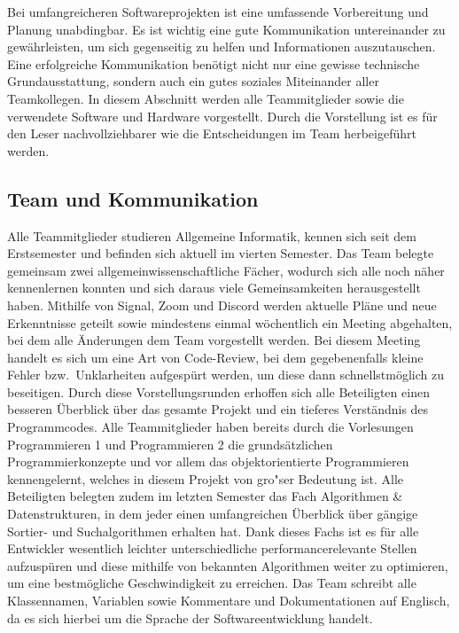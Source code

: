 Bei umfangreicheren Softwareprojekten ist eine umfassende Vorbereitung und Planung unabdingbar.
Es ist wichtig eine gute Kommunikation untereinander zu gew\"ahrleisten, um sich gegenseitig zu helfen und Informationen auszutauschen.
Eine erfolgreiche Kommunikation ben\"otigt nicht nur eine gewisse technische Grundausstattung, sondern auch ein gutes soziales Miteinander aller Teamkollegen.
In diesem Abschnitt werden alle Teammitglieder sowie die verwendete Software und Hardware vorgestellt.
Durch die Vorstellung ist es f\"ur den Leser nachvollziehbarer wie die Entscheidungen im Team herbeigef\"uhrt werden.

\subsection{Team und Kommunikation}\label{subsec:team-und-kommunikation}
Alle Teammitglieder studieren Allgemeine Informatik, kennen sich seit dem Erstsemester und befinden sich aktuell im vierten Semester.
Das Team belegte gemeinsam zwei allgemeinwissenschaftliche F\"acher, wodurch sich alle noch n\"aher kennenlernen konnten und sich daraus viele Gemeinsamkeiten herausgestellt haben.
Mithilfe von Signal, Zoom und Discord werden aktuelle Pl\"ane und neue Erkenntnisse geteilt sowie mindestens einmal w\"ochentlich ein Meeting abgehalten, bei dem alle \"Anderungen dem Team vorgestellt werden.
Bei diesem Meeting handelt es sich um eine Art von Code-Review, bei dem gegebenenfalls kleine Fehler bzw.\ Unklarheiten aufgesp\"urt werden, um diese dann schnellstm\"oglich zu beseitigen.
Durch diese Vorstellungsrunden erhoffen sich alle Beteiligten einen besseren \"Uberblick \"uber das gesamte Projekt und ein tieferes Verst\"andnis des Programmcodes.
Alle Teammitglieder haben bereits durch die Vorlesungen Programmieren 1 und Programmieren 2 die grunds\"atzlichen Programmierkonzepte und vor allem das objektorientierte Programmieren kennengelernt, welches in diesem Projekt von gro"ser Bedeutung ist.
Alle Beteiligten belegten zudem im letzten Semester das Fach Algorithmen \& Datenstrukturen, in dem jeder einen umfangreichen \"Uberblick \"uber g\"angige Sortier- und Suchalgorithmen erhalten hat.
Dank dieses Fachs ist es f\"ur alle Entwickler wesentlich leichter unterschiedliche performancerelevante Stellen aufzusp\"uren und diese mithilfe von bekannten Algorithmen weiter zu optimieren, um eine bestm\"ogliche Geschwindigkeit zu erreichen.
Das Team schreibt alle Klassennamen, Variablen sowie Kommentare und Dokumentationen auf Englisch, da es sich hierbei um die Sprache der Softwareentwicklung handelt.

